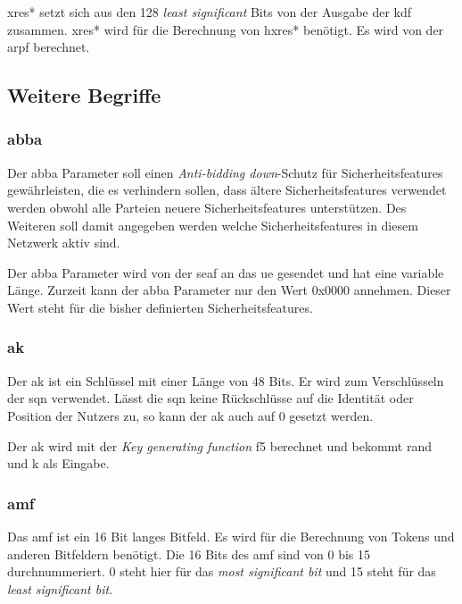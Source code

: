 \gls{xres*} setzt sich aus den 128 \textit{least significant} Bits von der Ausgabe der \gls{kdf} zusammen.
\gls{xres*} wird für die Berechnung von \gls{hxres*} benötigt.
Es wird von der \gls{arpf} berechnet.


\subsection{Weitere Begriffe}

\subsubsection{\gls{abba}}
Der \gls{abba} Parameter soll einen \textit{Anti-bidding down}-Schutz für Sicherheitsfeatures gewährleisten, die es verhindern sollen, dass ältere Sicherheitsfeatures verwendet werden obwohl alle Parteien neuere Sicherheitsfeatures unterstützen. %
Des Weiteren soll damit angegeben werden welche Sicherheitsfeatures in diesem Netzwerk aktiv sind.

Der \gls{abba} Parameter wird von der \gls{seaf} an das \gls{ue} gesendet und hat eine variable Länge.
Zurzeit kann der \gls{abba} Parameter nur den Wert 0x0000 annehmen. Dieser Wert steht für die bisher definierten Sicherheitsfeatures. %

\subsubsection{\gls{ak}}
Der \gls{ak} ist ein Schlüssel mit einer Länge von 48 Bits.
Er wird zum Verschlüsseln der \gls{sqn} verwendet. %
Lässt die \gls{sqn} keine Rückschlüsse auf die Identität oder Position der Nutzers zu, so kann der \gls{ak} auch auf 0 gesetzt werden. %

Der \gls{ak} wird mit der \textit{Key generating function} f5 berechnet und bekommt \gls{rand} und \gls{k} als Eingabe. %

\subsubsection{\gls{amf}}
Das \gls{amf} ist ein 16 Bit langes Bitfeld. %
Es wird für die Berechnung von Tokens und anderen Bitfeldern benötigt.
Die 16 Bits des \gls{amf} sind von 0 bis 15 durchnummeriert. %
0 steht hier für das \textit{most significant bit} und 15 steht für das \textit{least significant bit}.

